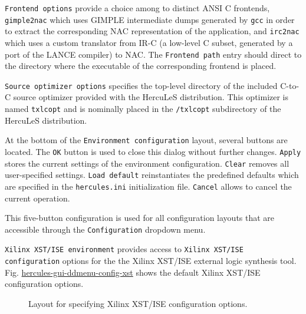 \documentclass[a4paper]{article}
\begin{document}
\texttt{Frontend options} provide a choice among to distinct ANSI C frontends, \texttt{gimple2nac} which uses GIMPLE intermediate dumps generated by \texttt{gcc} in order to extract the corresponding NAC representation of the application, and \texttt{irc2nac} which uses a custom translator from IR-C (a low-level C subset, generated by a port of the LANCE compiler) to NAC. The \texttt{Frontend path} entry should direct to the directory where the executable of the corresponding frontend is placed.

\texttt{Source optimizer options} specifies the top-level directory of the included C-to-C source optimizer provided with the HercuLeS distribution. This optimizer is named \texttt{txlcopt} and is nominally placed in the \texttt{/txlcopt} subdirectory of the HercuLeS distribution.

At the bottom of the \texttt{Environment configuration} layout, several buttons are located. The \texttt{OK} button is used to close this dialog without further changes. \texttt{Apply} stores the current settings of the environment configuration. \texttt{Clear} removes all user-specified settings. \texttt{Load default} reinstantiates the predefined defaults which are specified in the \texttt{hercules.ini} initialization file. \texttt{Cancel} allows to cancel the current operation.

This five-button configuration is used for all configuration layouts that are accessible through the \texttt{Configuration} dropdown menu.

\texttt{Xilinx XST/ISE environment} provides access to \texttt{Xilinx XST/ISE configuration} options for the the Xilinx XST/ISE external logic synthesis tool. Fig. \hyperref[hercules-gui-ddmenu-config-xst]{hercules-gui-ddmenu-config-xst} shows the default Xilinx XST/ISE configuration options.
\begin{figure}
\label{hercules-gui-ddmenu-config-xst}
\noindent{}
\caption{Layout for specifying Xilinx XST/ISE configuration options.}
\end{figure}
\end{document}
